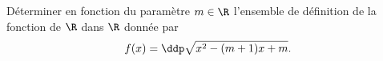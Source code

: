 
\begin{exercice}  \;
D\'eterminer en fonction du param\`etre $m\in\R$ l'ensemble de d\'efinition de la fonction de $\R$ dans $\R$ donn\'ee par
$$f(x)=\ddp\sqrt{x^2-(m+1)x+m}.$$
\end{exercice}